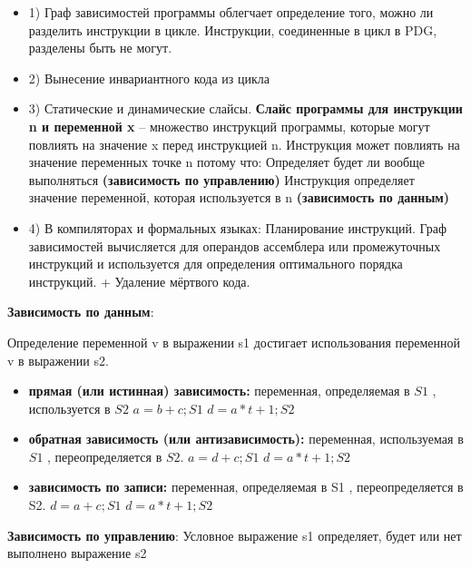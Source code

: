 \begin{itemize}
\item 1) Граф зависимостей программы облегчает определение того, можно ли разделить инструкции в цикле. Инструкции, соединенные в цикл в PDG, разделены быть не могут.
\item 2) Вынесение инвариантного кода из цикла
\item 3) Статические и динамические слайсы. \textbf{Слайс программы для инструкции n и переменной x} – множество инструкций программы, которые могут повлиять на значение x перед инструкцией n.
Инструкция может повлиять на значение переменных точке n потому что:
Определяет будет ли вообще выполняться \textbf{(зависимость по управлению)}
Инструкция определяет значение переменной, которая используется в n \textbf{(зависимость по данным)}
\item 4) В компиляторах и формальных языках:
Планирование инструкций. Граф зависимостей вычисляется для операндов ассемблера или промежуточных инструкций и используется для определения оптимального порядка инструкций. + Удаление мёртвого кода.
\end{itemize}

\textbf{Зависимость по данным}:

Определение переменной v в выражении s1 достигает
использования переменной v в выражении s2.
\begin{itemize}
\item \textbf{прямая (или истинная) зависимость:}
переменная, определяемая в $S1$ , используется в $S2$
$a = b + c; S1$
$d = a * t + 1; S2$
\item \textbf{обратная зависимость (или антизависимость):}
переменная, используемая в $S1$ , переопределяется в $S2$.
$a = d + c; S1$
$d = a * t + 1; S2$
\item \textbf{зависимость по записи:}
переменная, определяемая в S1 , переопределяется в S2.
$d = a + c; S1$
$d = a * t + 1; S2$



\end{itemize}

\textbf{Зависимость по управлению}:
Условное выражение s1 определяет, будет или нет выполнено выражение s2




